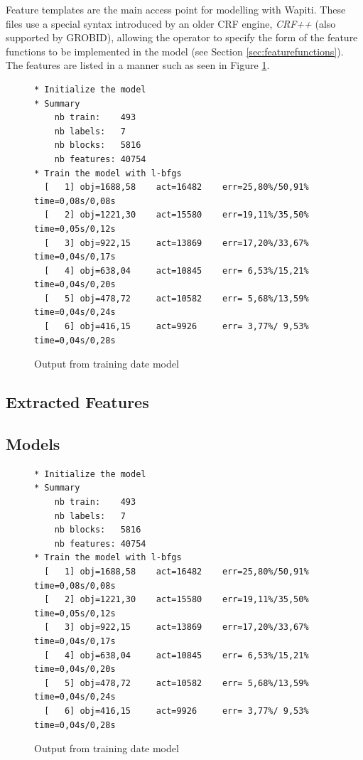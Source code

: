 Feature templates are the main access point for modelling with Wapiti. These files use a special syntax introduced by an older CRF engine, \emph{CRF++} (also supported by GROBID), allowing the operator to specify the form of the feature functions to be implemented in the model (see Section \ref{sec:featurefunctions}). The features are listed in a manner such as seen in Figure \ref{fig:featuretemplatefile}.

\begin{figure}
\begin{verbatim}
* Initialize the model
* Summary
    nb train:    493
    nb labels:   7
    nb blocks:   5816
    nb features: 40754
* Train the model with l-bfgs
  [   1] obj=1688,58    act=16482    err=25,80%/50,91% time=0,08s/0,08s
  [   2] obj=1221,30    act=15580    err=19,11%/35,50% time=0,05s/0,12s
  [   3] obj=922,15     act=13869    err=17,20%/33,67% time=0,04s/0,17s
  [   4] obj=638,04     act=10845    err= 6,53%/15,21% time=0,04s/0,20s
  [   5] obj=478,72     act=10582    err= 5,68%/13,59% time=0,04s/0,24s
  [   6] obj=416,15     act=9926     err= 3,77%/ 9,53% time=0,04s/0,28s
\end{verbatim}
\caption{Output from training date model}
\label{fig:featuretemplatefile}
\end{figure}


\subsection{Extracted Features}

\subsection{Models}


\begin{figure}
\begin{verbatim}
* Initialize the model
* Summary
    nb train:    493
    nb labels:   7
    nb blocks:   5816
    nb features: 40754
* Train the model with l-bfgs
  [   1] obj=1688,58    act=16482    err=25,80%/50,91% time=0,08s/0,08s
  [   2] obj=1221,30    act=15580    err=19,11%/35,50% time=0,05s/0,12s
  [   3] obj=922,15     act=13869    err=17,20%/33,67% time=0,04s/0,17s
  [   4] obj=638,04     act=10845    err= 6,53%/15,21% time=0,04s/0,20s
  [   5] obj=478,72     act=10582    err= 5,68%/13,59% time=0,04s/0,24s
  [   6] obj=416,15     act=9926     err= 3,77%/ 9,53% time=0,04s/0,28s
\end{verbatim}
\caption{Output from training date model}
\label{fig:output}
\end{figure}

